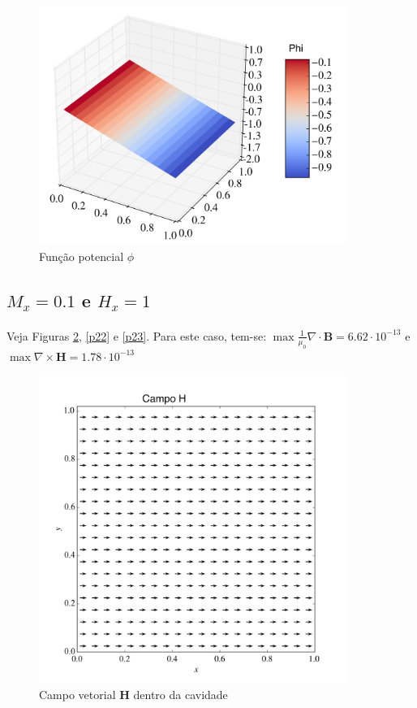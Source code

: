 \documentclass[a4paper,11pt]{article}
\begin{document}
\begin{figure}[!ht]
\centering
\includegraphics[width=10cm]{img/phiProblem0.png}
\caption{Função potencial $\phi$\label{p13}}
\end{figure}

\newpage
\subsection{$M_x = 0.1$ e $H_x = 1$}

\paragraph{} Veja Figuras \ref{p21}, \ref{p22} e \ref{p23}. Para este caso, tem-se: $\max \frac{1}{\mu_0}\nabla\cdot \mathbf{B}  = 6.62\cdot 10^{-13}$ e $\max \nabla\times \mathbf{H}  =1.78\cdot 	10^{-13}$


\begin{figure}[!ht]
\centering
\includegraphics[width=10cm]{img/Hproblem1.png}
\caption{Campo vetorial $\mathbf{H}$ dentro da cavidade\label{p21}}
\end{figure}
\end{document}
